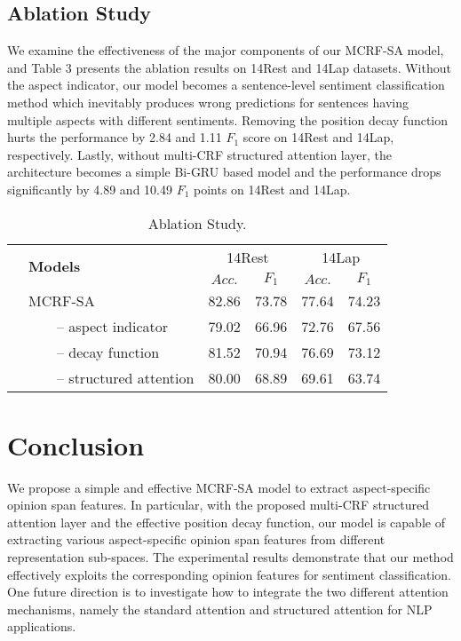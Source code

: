 \documentclass[11pt,a4paper]{article}
\begin{document}
\subsection{Ablation Study} 
We examine the effectiveness of the major components of our MCRF-SA model, and 
Table 3 presents the ablation results on 14Rest and 14Lap datasets.
Without the aspect indicator, our model becomes a sentence-level sentiment classification method which inevitably produces wrong predictions for sentences having multiple aspects with different sentiments. 
Removing the position decay function hurts the performance by 2.84 and 1.11 $F_1$ score on 14Rest and 14Lap,  respectively. 
Lastly,  without multi-CRF structured attention layer, the architecture becomes a simple Bi-GRU based model and the performance drops significantly by 4.89 and 10.49 $F_1$ points on 14Rest and 14Lap. 
\begin{table}[t!]
\centering
\resizebox{\columnwidth}{!}
{\begin{tabular}{llcccc}
    \toprule
      & \multirow{2}{*}{\textbf{Models}} & \multicolumn{2}{c}{14Rest}& \multicolumn{2}{c}{14Lap}  \\ \cmidrule(lr){3-4} \cmidrule(lr){5-6}
       & & $Acc.$ & $F_1$& $Acc.$ & $F_1$\\ \hline 
        &MCRF-SA & 82.86 & 73.78 & 77.64 & 74.23\\ 
        &~~~~--  aspect indicator & 79.02 & 66.96  & 72.76 & 67.56\\
        &~~~~--  decay function & 81.52 & 70.94 & 76.69 & 73.12\\
        &~~~~--  structured attention & 80.00 & 68.89 & 69.61 & 63.74 \\ 
        
    \bottomrule
    \end{tabular}}
\caption{Ablation Study. } 


\end{table}


\section{Conclusion}
We propose a simple and effective MCRF-SA model to extract aspect-specific opinion span features. In particular, with the proposed multi-CRF structured attention layer and the effective position decay function, our model is capable of extracting various aspect-specific opinion span features from different representation sub-spaces. The experimental results demonstrate that our method effectively exploits the corresponding opinion features for sentiment classification. One future direction is to investigate how to integrate the two different attention mechanisms, namely the standard attention  and  structured  attention for NLP applications. 
\end{document}
